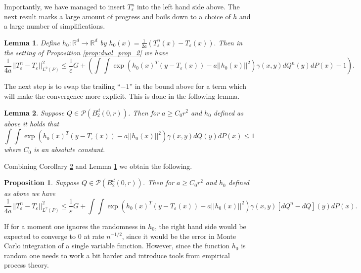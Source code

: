 \documentclass{article}
\newtheorem{lemma}{Lemma}
\newtheorem{proposition}{Proposition}
\theoremstyle{definition}
\newcommand{\Teps}{T_\varepsilon}
\begin{document}
Importantly, we have managed to insert $\Teps^n$ into the left hand side above. The next result marks a large amount of progress and boils down to a choice of $h$ and a large number of simplifications. 
\begin{lemma} \label{lem:h0_bound}
    Define $h_0:\mathbb{R}^d\rightarrow \mathbb{R}^d$ by $\displaystyle
        h_0(x) = \frac{1}{2a}\left (\Teps^n(x) - \Teps(x) \right ).$
    Then in the setting of Proposition \ref{prop:dual_prop_2} we have
    \begin{equation*}
        \frac{1}{4a}||\Teps^n - \Teps||_{L^2(P)}^2 \leq \frac{1}{\varepsilon}G + \left (\int\int \exp\left (h_0(x)^T(y - \Teps(x)) - a||h_0(x)||^2 \right )\gamma(x,y) dQ^n(y)dP(x) - 1 \right ). %
    \end{equation*}
\end{lemma}
The next step is to swap the trailing ``$-1$'' in the bound above for a term which will make the convergence more explicit. This is done in the following lemma.
\begin{lemma} \label{lem:true_Q_bound}
    Suppose $Q \in \mathcal{P}(B_2^d(0,r))$. Then for $a \geq C_0r^2$ and $h_0$ defined as above it holds that
    \begin{equation*}
        \int\int \exp\left (h_0(x)^T(y - \Teps(x)) - a||h_0(x)||^2 \right )\gamma(x,y) dQ(y) dP(x) \leq 1
    \end{equation*}
    where $C_0$ is an absolute constant.
\end{lemma}
Combining Corollary \ref{lem:true_Q_bound} and Lemma \ref{lem:h0_bound} we obtain the following.
\begin{proposition} \label{proposition:pre_ep} Suppose $Q \in \mathcal{P}(B_2^d(0,r))$. Then for $a \geq C_0r^2$ and $h_0$ defined as above we have
\begin{equation*}
        \frac{1}{4a}||\Teps^n - \Teps||_{L^2(P)}^2 \leq \frac{1}{\varepsilon}G + \int\int \exp\left (h_0(x)^T(y - \Teps(x)) - a||h_0(x)||^2 \right )\gamma(x,y) [dQ^n - dQ](y)dP(x).
\end{equation*}
\end{proposition}

If for a moment one ignores the randomness in $h_0$, the right hand side would be expected to converge to 0 at rate $n^{-1/2}$, since it would be the error in Monte Carlo integration of a single variable function. However, since the function $h_0$ is random one needs to work a bit harder and introduce tools from empirical process theory. 
\end{document}
